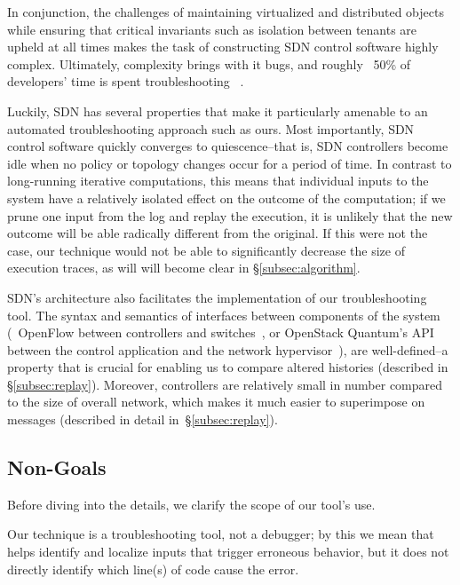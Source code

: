 In conjunction, the challenges of maintaining virtualized and distributed
objects while ensuring that critical invariants such as isolation between
tenants are upheld at all times makes the task of constructing
SDN control software highly complex. Ultimately, complexity brings with it
bugs, and roughly ~50\% of developers' time is spent troubleshooting
~\cite{msoft_concurrency}. %

Luckily, SDN has several properties that make it particularly amenable to an
automated troubleshooting approach such as ours. Most importantly, SDN control software
quickly converges to quiescence--that is, SDN controllers become idle when no policy or
topology changes occur for a period of time. In contrast to long-running iterative computations,
this means that individual inputs to the system have a relatively isolated effect on the outcome
of the computation; if we prune one input from the log and replay the execution, it is unlikely
that the new outcome will be able radically different from the original. If this were not the case, our
technique would not be able to significantly decrease the size of execution traces, as will will become clear in
\S\ref{subsec:algorithm}.

SDN's architecture also facilitates the implementation of our troubleshooting
tool. The syntax and semantics of interfaces between components of the system (\eg~OpenFlow
between controllers and switches~\cite{openflow}, or
OpenStack Quantum's API between
the control application and the network hypervisor~\cite{quantum}), are
well-defined--a property that is crucial for
enabling us to compare altered histories (described in \S\ref{subsec:replay}).
Moreover, controllers are relatively small in number compared to the size of
overall network, which makes it much easier to superimpose
on messages (described in detail in~\S\ref{subsec:replay}).

\subsection{Non-Goals}
\label{subsec:non_goals}

Before diving into the
details, we clarify the scope of our tool's use.

 Our technique is a troubleshooting tool, not a debugger;
by this we mean that \simulator{} helps identify and localize inputs that
trigger erroneous behavior, but it does not directly identify which
line(s) of code cause the error.

